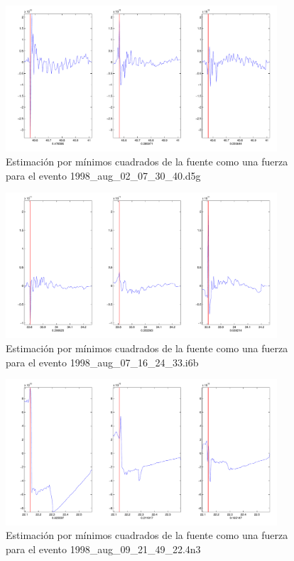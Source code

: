 \begin{figure}[H]
\includegraphics[width=0.9\textwidth,height=0.4\textheight]{linea_timerev/figuras/plotSrcEv1src.pdf}
\caption{Estimación por mínimos cuadrados de la fuente como una fuerza para el
evento 1998\_aug\_02\_07\_30\_40.d5g}
\end{figure}
\begin{figure}[H]
\includegraphics[width=0.9\textwidth,height=0.4\textheight]{linea_timerev/figuras/plotSrcEv2src.pdf}
\caption{Estimación por mínimos cuadrados de la fuente como una fuerza para el
evento 1998\_aug\_07\_16\_24\_33.i6b}
\end{figure}
\begin{figure}[H]
\includegraphics[width=0.9\textwidth,height=0.4\textheight]{linea_timerev/figuras/plotSrcEv3src.pdf}
\caption{Estimación por mínimos cuadrados de la fuente como una fuerza para el
evento 1998\_aug\_09\_21\_49\_22.4n3}
\end{figure}
